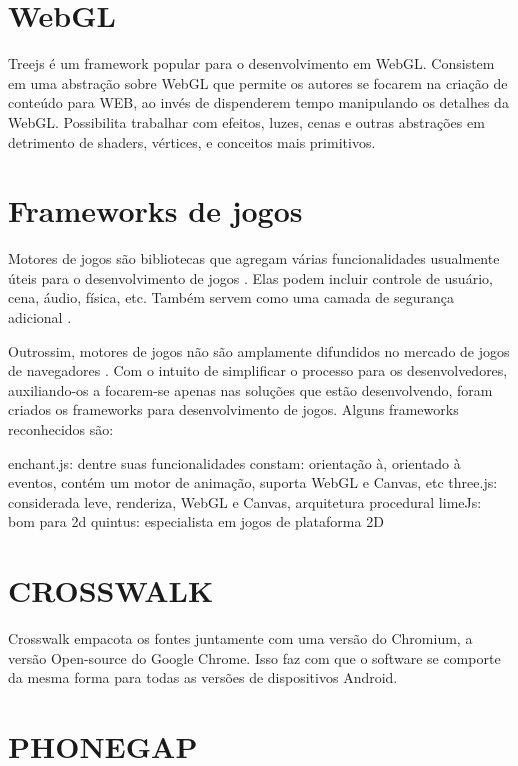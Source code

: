 \section{WebGL}

Treejs é um framework popular para o desenvolvimento em WebGL.
Consistem em uma abstração sobre WebGL que permite os autores se
focarem na criação de conteúdo para WEB, ao invés de dispenderem
tempo manipulando os detalhes da WebGL. Possibilita trabalhar com
efeitos, luzes, cenas e outras abstrações em detrimento de shaders,
vértices, e conceitos mais primitivos.

\section{Frameworks de jogos}

Motores de jogos são bibliotecas que agregam várias funcionalidades
usualmente úteis para o desenvolvimento de jogos \autocite[pp.
5]{browserGamesTechnologyAndFuture}. Elas podem incluir controle
de usuário, cena, áudio, física, etc. Também servem como uma camada de 
segurança adicional \autocite{browserGamesTechnologyAndFuture}.

Outrossim,
motores de jogos não são amplamente difundidos no mercado de jogos de
navegadores \autocite{browserGamesTechnologyAndFuture}.
Com o intuito de simplificar o processo para os desenvolvedores,
auxiliando-os a focarem-se apenas nas soluções que estão
desenvolvendo, foram criados os frameworks para desenvolvimento de
jogos. Alguns frameworks reconhecidos são:

enchant.js: dentre suas funcionalidades constam: orientação à, orientado à eventos, contém um motor de animação,
suporta WebGL e Canvas, etc three.js: considerada leve, renderiza, WebGL e Canvas, arquitetura procedural
limeJs: bom para 2d
quintus: especialista em jogos de plataforma 2D

\section{CROSSWALK}

Crosswalk empacota os fontes juntamente com uma versão do Chromium, a
versão Open-source do Google Chrome. Isso faz com que o software se
comporte da mesma forma para todas as versões de dispositivos Android.

\section{PHONEGAP}

